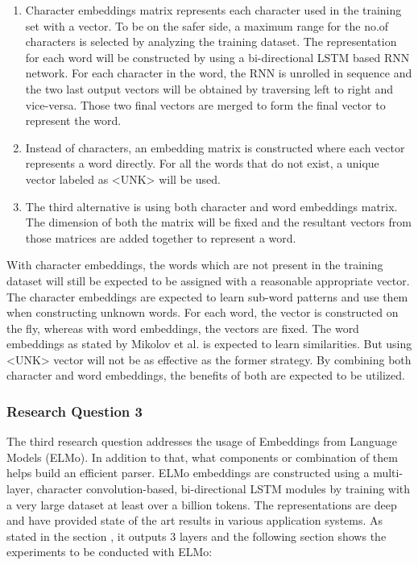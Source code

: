\documentclass[a4paper, 11pt]{article}
\begin{document}
\begin{enumerate}
\item Character embeddings matrix represents each character used in the training set with a vector. To be on the safer side, a maximum range for the no.of characters is selected by analyzing the training dataset. The representation for each word will be constructed by using a bi-directional LSTM based RNN network. For each character in the word, the RNN is unrolled in sequence and the two last output vectors will be obtained by traversing left to right and vice-versa. Those two final vectors are merged to form the final vector to represent the word.
\item Instead of characters, an embedding matrix is constructed where each vector represents a word directly. For all the words that do not exist, a unique vector labeled as <UNK> will be used. 
\item The third alternative is using both character and word embeddings matrix. The dimension of both the matrix will be fixed and the resultant vectors from those matrices are added together to represent a word. 
\end{enumerate}

With character embeddings, the words which are not present in the training dataset will still be expected to be assigned with a reasonable appropriate vector. The character embeddings are expected to learn sub-word patterns and use them when constructing unknown words. For each word, the vector is constructed on the fly, whereas with word embeddings, the vectors are fixed. The word embeddings as stated by Mikolov et al. \parencite{mikolov2013linguistic} is expected to learn similarities. But using <UNK> vector will not be as effective as the former strategy. By combining both character and word embeddings, the benefits of both are expected to be utilized. 
\subsubsection{Research Question 3}

The third research question addresses the usage of Embeddings from Language Models (ELMo). In addition to that, what components or combination of them helps build an efficient parser. ELMo embeddings are constructed using a multi-layer, character convolution-based, bi-directional LSTM modules by training with a very large dataset at least over a billion tokens. The representations are deep and have provided state of the art results in various application systems. As stated in the section , it outputs 3 layers and the following section shows the experiments to be conducted with ELMo:
\end{document}
